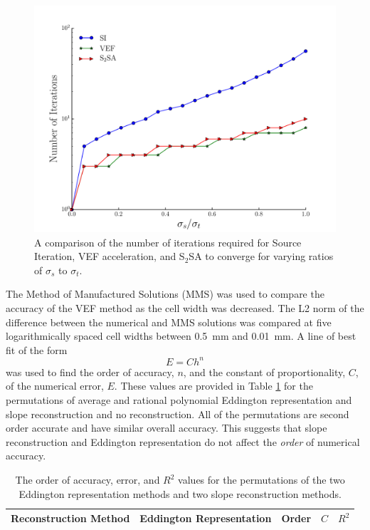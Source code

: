 	\begin{figure}
		\centering
		\includegraphics[width=.75\textwidth]{figs/si_vef_s2sa.pdf} 
		\caption{A comparison of the number of iterations required for Source Iteration, VEF acceleration, and S$_2$SA to converge for varying ratios of $\sigma_s$ to $\sigma_t$. } 
		\label{fig:si_vef_s2sa}
	\end{figure}

The Method of Manufactured Solutions (MMS) was used to compare the accuracy of the VEF method as the cell width was decreased. 
 The L2 norm of the difference between the numerical and MMS solutions was compared at five logarithmically spaced cell widths between \SI{0.5}{mm} and \SI{0.01}{mm}. A line of best fit of the form 
	\begin{equation}
		E = C h^n
	\end{equation}
was used to find the order of accuracy, $n$, and the constant of proportionality, $C$, of the numerical error, $E$. These values are provided in Table \ref{tab:mms} for the permutations of average and rational polynomial Eddington representation and slope reconstruction and no reconstruction. All of the permutations are second order accurate and have similar overall accuracy. This suggests that slope reconstruction and Eddington representation do not affect the {\it order} of numerical accuracy. 

	\begin{table} \centering
	\begin{tabular}{|c|c|c|c|c|}
	\hline
	\hline
	Reconstruction Method & Eddington Representation & Order & $C$ & $R^2$ \\ 
	\hline
		
	\hline
	\hline
	\end{tabular}
	\caption{The order of accuracy, error, and $R^2$ values for the permutations of the two Eddington representation methods and two slope reconstruction methods. }
	\label{tab:mms}
	\end{table}

